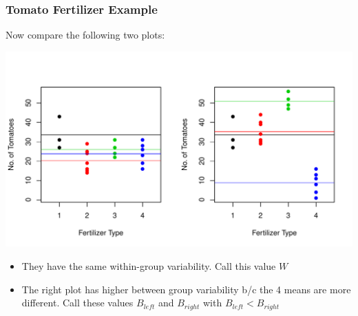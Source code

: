 \documentclass[handout]{beamer}
\newcommand{\blue}[1]{\textcolor{blue2}{#1}}
\begin{document}
\begin{frame}
\frametitle{Tomato Fertilizer Example}
Now compare the following two plots:
\begin{center}
\includegraphics{figure/lec22-008}
\end{center}

\begin{itemize}
\pause \item They have the \blue{same within-group} variability.  Call this value $W$
\pause \item The right plot has \blue{higher between group variability}  b/c the 4 means are more different.  Call these values $B_{left}$ and $B_{right}$ with $B_{left} < B_{right}$
\end{itemize}

\end{frame}
\end{document}
